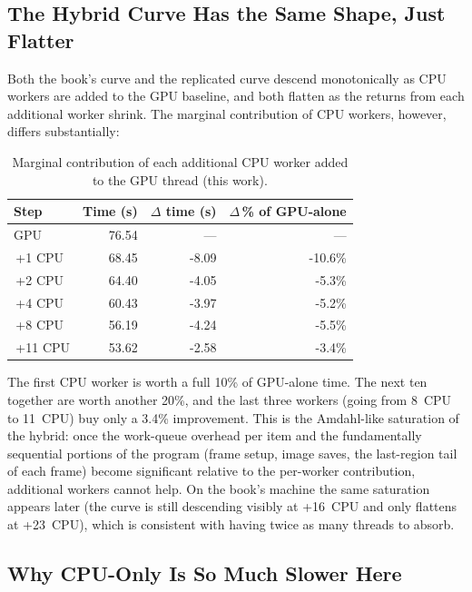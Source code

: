 \documentclass[
	english,
	letterpaper, oneside
]{article}
\begin{document}
\subsection{The Hybrid Curve Has the Same Shape, Just Flatter}

Both the book's curve and the replicated curve descend monotonically as
CPU workers are added to the GPU baseline, and both flatten as the
returns from each additional worker shrink. The marginal contribution
of CPU workers, however, differs substantially:

\begin{table}[H]
    \centering
    \caption{Marginal contribution of each additional CPU worker added
             to the GPU thread (this work).}
    \label{tab:marginal}
    \begin{tabular}{lrrr}
        \hline
        Step & Time (s) & $\Delta$ time (s) & $\Delta$\,\% of GPU-alone \\
        \hline
        GPU            & 76.54 &   ---  &   --- \\
        \,+1 CPU       & 68.45 & -8.09  & -10.6\% \\
        \,+2 CPU       & 64.40 & -4.05  &  -5.3\% \\
        \,+4 CPU       & 60.43 & -3.97  &  -5.2\% \\
        \,+8 CPU       & 56.19 & -4.24  &  -5.5\% \\
        \,+11 CPU      & 53.62 & -2.58  &  -3.4\% \\
        \hline
    \end{tabular}
\end{table}

The first CPU worker is worth a full 10\% of GPU-alone time. The next
ten together are worth another 20\%, and the last three workers (going
from 8~CPU to 11~CPU) buy only a 3.4\% improvement. This is the
Amdahl-like saturation of the hybrid: once the work-queue
overhead per item and the fundamentally sequential portions of the
program (frame setup, image saves, the last-region tail of each frame)
become significant relative to the per-worker contribution, additional
workers cannot help. On the book's machine the same saturation appears
later (the curve is still descending visibly at +16~CPU and only flattens
at +23~CPU), which is consistent with having twice as many threads to
absorb.

\subsection{Why CPU-Only Is So Much Slower Here}
\end{document}
